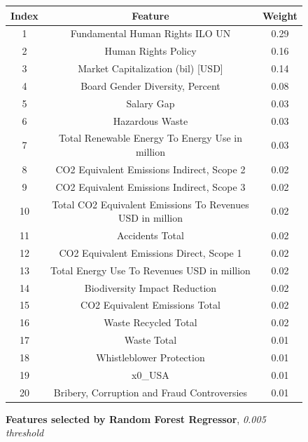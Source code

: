 \documentclass[12pt]{report}
\begin{document}
\begin{figure}[h!]
\begin{center}
\begin{tabular}{ |c|c|c| }
\hline
 Index & Feature & Weight \\
 \hline\hline
 1 & Fundamental Human Rights ILO UN & 0.29 \\  
 2 & Human Rights Policy & 0.16 \\
 3 & Market Capitalization (bil) [USD] & 0.14 \\
 4 & Board Gender Diversity, Percent & 0.08 \\
 5 & Salary Gap & 0.03 \\
 6 & Hazardous Waste & 0.03 \\
 7 & Total Renewable Energy To Energy Use in million & 0.03 \\
 8 & CO2 Equivalent Emissions Indirect, Scope 2 & 0.02 \\
 9 & CO2 Equivalent Emissions Indirect, Scope 3 & 0.02 \\
 10 & Total CO2 Equivalent Emissions To Revenues USD in million & 0.02 \\
 11 & Accidents Total & 0.02 \\
 12 & CO2 Equivalent Emissions Direct, Scope 1 & 0.02 \\
 13 & Total Energy Use To Revenues USD in million & 0.02 \\
 14 & Biodiversity Impact Reduction & 0.02 \\
 15 & CO2 Equivalent Emissions Total & 0.02 \\
 16 & Waste Recycled Total & 0.02\\
 17 & Waste Total & 0.01 \\
 18 & Whistleblower Protection & 0.01 \\
 19 & x0\_USA & 0.01 \\
 20 & Bribery, Corruption and Fraud Controversies & 0.01 \\
\hline
\end{tabular}
\end{center}
\caption{\textbf{Features selected by Random Forest Regressor}, \textit{0.005 threshold}}
\label{fig:featureselection}
\end{figure}
\end{document}
